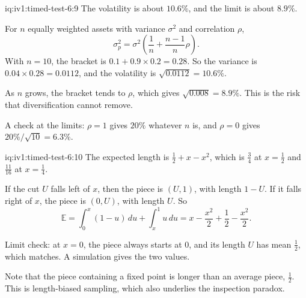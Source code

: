 \begin{solution}{iq:iv1:timed-test-6:9}
The volatility is about $10.6\%$, and the limit is about $8.9\%$.

For $n$ equally weighted assets with variance $\sigma^2$ and correlation $\rho$,
\[
\sigma_p^2 = \sigma^2\left(\frac{1}{n} + \frac{n - 1}{n}\rho\right).
\]
With $n = 10$, the bracket is $0.1 + 0.9 \times 0.2 = 0.28$. So the variance is $0.04 \times 0.28 = 0.0112$, and the volatility is $\sqrt{0.0112} = 10.6\%$.

As $n$ grows, the bracket tends to $\rho$, which gives $\sqrt{0.008} = 8.9\%$. This is the risk that diversification cannot remove.

A check at the limits: $\rho = 1$ gives $20\%$ whatever $n$ is, and $\rho = 0$ gives $20\%/\sqrt{10} = 6.3\%$.

\end{solution}

\begin{solution}{iq:iv1:timed-test-6:10}
The expected length is $\frac12 + x - x^2$, which is $\frac34$ at $x = \frac12$ and $\frac{11}{16}$ at $x = \frac14$.

If the cut $U$ falls left of $x$, then the piece is $(U, 1)$, with length $1 - U$. If it falls right of $x$, the piece is $(0, U)$, with length $U$. So
\[
\mathbb{E} = \int_0^x(1 - u)\,du + \int_x^1u\,du = x - \frac{x^2}{2} + \frac12 - \frac{x^2}{2}.
\]

Limit check: at $x = 0$, the piece always starts at 0, and its length $U$ has mean $\frac12$, which matches. A simulation gives the two values.

Note that the piece containing a fixed point is longer than an average piece, $\frac12$. This is length-biased sampling, which also underlies the inspection paradox.

\end{solution}

